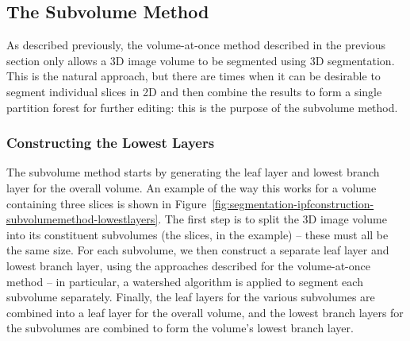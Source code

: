 \subsection{The Subvolume Method}
\label{subsec:segmentation-ipfconstruction-subvolume}

As described previously, the volume-at-once method described in the previous section only allows a 3D image volume to be segmented using 3D segmentation. This is the natural approach, but there are times when it can be desirable to segment individual slices in 2D and then combine the results to form a single partition forest for further editing: this is the purpose of the subvolume method.

\subsubsection{Constructing the Lowest Layers}

The subvolume method starts by generating the leaf layer and lowest branch layer for the overall volume. An example of the way this works for a volume containing three slices is shown in Figure~\ref{fig:segmentation-ipfconstruction-subvolumemethod-lowestlayers}. The first step is to split the 3D image volume into its constituent subvolumes (the slices, in the example) -- these must all be the same size. For each subvolume, we then construct a separate leaf layer and lowest branch layer, using the approaches described for the volume-at-once method -- in particular, a watershed algorithm is applied to segment each subvolume separately. Finally, the leaf layers for the various subvolumes are combined into a leaf layer for the overall volume, and the lowest branch layers for the subvolumes are combined to form the volume's lowest branch layer.



